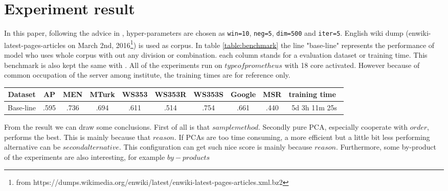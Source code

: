 \section{Experiment result}\label{experiment_result}
In this paper, following the advice in \cite{levy2015improving}, hyper-parameters are chosen as \verb|win=10|, \verb|neg=5|, \verb|dim=500| and \verb|iter=5|. English wiki dump (enwiki-latest-pages-articles on March 2nd, 2016\footnote{from https://dumps.wikimedia.org/enwiki/latest/enwiki-latest-pages-articles.xml.bz2}) is used as corpus. In table \ref{table:benchmark} the line "base-line" represents the performance of model who uses whole corpus with out any division or combination. each column stands for a evaluation dataset or training time. This benchmark is also kept the same with \cite{levy2015improving}. All of the experiments run on $type of prometheus$ with 18 core activated. However because of common occupation of the server among institute, the training times are for reference only.

\begin{table*}
\caption{Performance and training time of different combination strategies}
\begin{tabular}{c|cccccccc|c}
\hline
Dataset   & AP   & MEN  & MTurk & WS353 & WS353R & WS353S & Google & MSR  & training time\ \tabularnewline \hline
Base-line & .595 & .736 & .694  & .611  & .514   & .754   & .661   & .440 & 5d 3h 11m 25s\\ \hline
\end{tabular}
\label{table:benchmark}
\end{table*}

From the result we can draw some conclusions. First of all is that $sample method$. Secondly pure PCA, especially cooperate with $order$, performs the best. This is mainly because that $reason$. If PCAs are too time consuming, a more efficient but a little bit less performing alternative can be $second alternative$. This configuration can get such nice score is mainly because $reason$. Furthermore, some by-product of the experiments are also interesting, for example $by-products$
